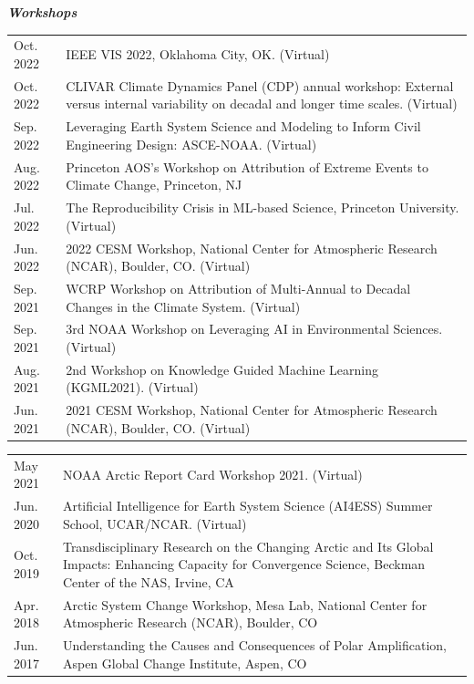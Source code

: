 \documentclass[margin,line,palatino,courier,10pt]{res}
\begin{document}
\begin{resume}
\textit{\textbf{Workshops}}
\vspace*{0.05in}\\
\begin{tabular}{@{}p{0.9in}p{4in}}
Oct. 2022 & IEEE VIS 2022, Oklahoma City, OK. (Virtual)\\
Oct. 2022 & CLIVAR Climate Dynamics Panel (CDP) annual workshop: External versus internal variability on decadal and longer time scales. (Virtual)\\
Sep. 2022 & Leveraging Earth System Science and Modeling to Inform Civil Engineering Design: ASCE-NOAA. (Virtual)\\
Aug. 2022 & Princeton AOS's Workshop on Attribution of Extreme Events to Climate Change, Princeton, NJ\\
Jul. 2022 & The Reproducibility Crisis in ML-based Science, Princeton University. (Virtual)\\
Jun. 2022 & 2022 CESM Workshop, National Center for Atmospheric Research (NCAR), Boulder, CO. (Virtual)\\
Sep. 2021 & WCRP Workshop on Attribution of Multi-Annual to Decadal Changes in the Climate System. (Virtual)\\
Sep. 2021 & 3rd NOAA Workshop on Leveraging AI in Environmental Sciences. (Virtual)\\
Aug. 2021 & 2nd Workshop on Knowledge Guided Machine Learning (KGML2021). (Virtual)\\
Jun. 2021 & 2021 CESM Workshop, National Center for Atmospheric Research (NCAR), Boulder, CO. (Virtual)\\
\end{tabular}
\begin{tabular}{@{}p{0.9in}p{4in}}
May 2021 & NOAA Arctic Report Card Workshop 2021. (Virtual)\\
Jun. 2020 & Artificial Intelligence for Earth System Science (AI4ESS) Summer School, UCAR/NCAR. (Virtual)\\
Oct. 2019 & Transdisciplinary Research on the Changing Arctic and Its Global Impacts:  Enhancing Capacity for Convergence Science, Beckman Center of the NAS, Irvine, CA\\
Apr. 2018 & Arctic System Change Workshop, Mesa Lab, National Center for Atmospheric Research (NCAR), Boulder, CO\\
Jun. 2017 & Understanding the Causes and Consequences of Polar Amplification, Aspen Global Change Institute, Aspen, CO
\end{tabular}

\vspace{-0.1in}
\noindent\textcolor{Cerulean}{\makebox[\linewidth][r]{\rule{\textwidth}{5pt}}}
\vspace{-0.3in}

\end{resume}
\end{document}
